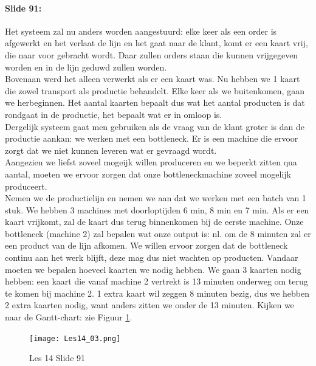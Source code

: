 \documentclass[10pt,a4paper]{report}
\begin{document}
\paragraph{Slide 91:} Het systeem zal nu anders worden aangestuurd: elke keer als een order is afgewerkt en het verlaat de lijn en het gaat naar de klant, komt er een kaart vrij, die naar voor gebracht wordt. Daar zullen orders staan die kunnen vrijgegeven worden en in de lijn geduwd zullen worden.\\
Bovenaan werd het alleen verwerkt als er een kaart was. Nu hebben we 1 kaart die zowel transport als productie behandelt. Elke keer als we buitenkomen, gaan we herbeginnen. Het aantal kaarten bepaalt dus wat het aantal producten is dat rondgaat in de productie, het bepaalt wat er in omloop is.\\
Dergelijk systeem gaat men gebruiken als de vraag van de klant groter is dan de productie aankan: we werken met een bottleneck. Er is een machine die ervoor zorgt dat we niet kunnen leveren wat er gevraagd wordt.\\
Aangezien we liefst zoveel mogeijk willen produceren en we beperkt zitten qua aantal, moeten we ervoor zorgen dat onze bottleneckmachine zoveel mogelijk produceert. \\
Nemen we de productielijn en nemen we aan dat we werken met een batch van 1 stuk. We hebben 3 machines met doorloptijden 6 min, 8 min en 7 min. Als er een kaart vrijkomt, zal de kaart dus terug binnenkomen bij de eerste machine. Onze bottleneck (machine 2) zal bepalen wat onze output is: nl. om de 8 minuten zal er een product van de lijn afkomen. We willen ervoor zorgen dat de bottleneck continu aan het werk blijft, deze mag dus niet wachten op producten. Vandaar moeten we bepalen hoeveel kaarten we nodig hebben. We gaan 3 kaarten nodig hebben: een kaart die vanaf machine 2 vertrekt is 13 minuten onderweg om terug te komen bij machine 2. 1 extra kaart wil zeggen 8 minuten bezig, dus we hebben 2 extra kaarten nodig, want anders zitten we onder de 13 minuten. Kijken we naar de Gantt-chart: zie Figuur \ref{les14_03}.\\

\begin{figure}[h!]
\centering
\texttt{[image: Les14\_03.png]}
\caption{Les 14 Slide 91} 
\label{les14_03}
\end{figure}
\end{document}
